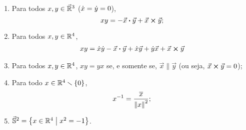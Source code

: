 \begin{proposition}
	\begin{enumerate}
	\item Para todos $x,y \in \vec{\mathbb{R}}^3$ ($\dot{x} = \dot{y} = 0$),
		\begin{equation*}
		xy = - {\vec{x}} \bm{\cdot} {\vec{y}} + {\vec{x}} \bm{\times} {\vec{y}};
		\end{equation*}
	\item Para todos $x,y \in \mathbb{R}^4$,
		\begin{align*}
		xy &= \dot{x}\dot{y} - {\vec{x}} \bm{\cdot} {\vec{y}}+\dot{x}\vec{y}+\dot{y}\vec{x}+{\vec{x}} \bm{\times} {\vec{y}} \\
		\end{align*}
	
	\item Para todos $x,y \in \mathbb{R}^4$, $xy=yx$ se, e somente se, $\vec{x} \parallel \vec{y}$ (ou seja, ${\vec{x}} \bm{\times} {\vec{y}}=0$);
	
	\item Para todo $x \in \mathbb{R}^4 \smallsetminus \{0\}$,
		\begin{equation*}
		x^{-1} = \frac{\overline{x}}{\left\Vert{x}\right\Vert^2};
		\end{equation*}
	
	\item $\vec{\mathbb{S}}^2 = \left\{{x \in \mathbb{R}^4}\;\middle\vert\;{x^2 = -1}\right\}$.
	\end{enumerate}
\end{proposition}
